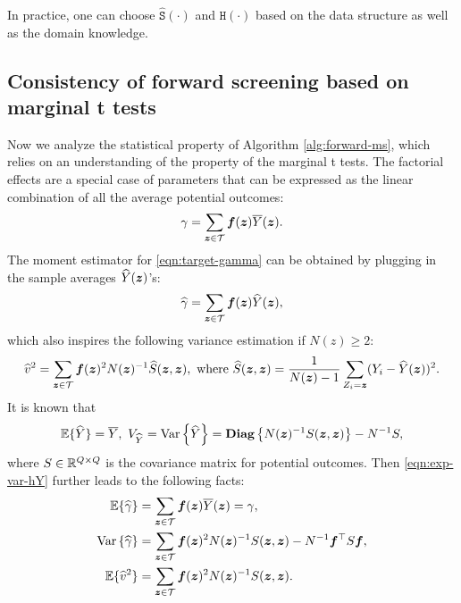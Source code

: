 \documentclass[12pt]{article}
\begin{document}
In practice, one can choose $\hat{\texttt{S}}(\cdot)$ and $\texttt{H}(\cdot)$ based on the data structure as well as the domain knowledge. 

\subsection{Consistency of forward screening based on marginal t tests}

Now we analyze the statistical property of Algorithm \ref{alg:forward-ms}, which relies on an understanding of the property of the marginal t tests. The factorial effects are a special case of parameters that can be expressed as the linear combination of all the average potential outcomes:
\begin{align}
\gamma = \sum_{{\boldsymbol{z}}\in{\mathcal{T}}} {\boldsymbol{f}}({\boldsymbol{z}})\overline{Y}({\boldsymbol{z}}). \label{eqn:target-gamma}
\end{align}
The moment estimator for \eqref{eqn:target-gamma} can be obtained by plugging in the sample averages ${\widehat{Y}}({\boldsymbol{z}})$'s:
\begin{align}\label{eqn:hgamma}
    {\widehat{\gamma}} = \sum_{{\boldsymbol{z}}\in{\mathcal{T}}} {\boldsymbol{f}}({\boldsymbol{z}})\widehat{Y}({\boldsymbol{z}}),
\end{align}
which also inspires the following variance estimation if $N(z) \ge 2$:
\begin{align}\label{eqn:hv2R}
    \widehat{v}^2 = \sum_{{\boldsymbol{z}}\in{\mathcal{T}}} {\boldsymbol{f}}({\boldsymbol{z}})^2 N({\boldsymbol{z}})^{-1} \widehat{S}({\boldsymbol{z}},{\boldsymbol{z}}), \text{ where } \widehat{S}({\boldsymbol{z}},{\boldsymbol{z}}) = \frac{1}{N({\boldsymbol{z}})-1}\sum_{Z_i = {\boldsymbol{z}}} (Y_i - {\widehat{Y}}({\boldsymbol{z}}))^2.
\end{align}
It is known that \citep{li2017general}
\begin{align}\label{eqn:exp-var-hY}
    {\mathbb{E}}\{{\widehat{Y}}\} = \overline{Y},~ V_{\widehat{Y}} = {\operatorname{Var}\left\{{\widehat{Y}}\right\}} = \text{\bfseries Diag}\left\{N({\boldsymbol{z}})^{-1}S({\boldsymbol{z}},{\boldsymbol{z}})\right\} - N^{-1}S,
\end{align}
where $S\in{\mathbb{R}}^{Q\times Q}$ is the covariance matrix for potential outcomes. Then \eqref{eqn:exp-var-hY} further leads to the following facts:
\begin{align}
    {\mathbb{E}}\{{\widehat{\gamma}}\} &= \sum_{{\boldsymbol{z}}\in{\mathcal{T}}} {\boldsymbol{f}}({\boldsymbol{z}})\overline{Y}({\boldsymbol{z}}) = \gamma, \label{eqn:mean-hgamma}\\
    {\operatorname{Var}\left\{{\widehat{\gamma}}\right\}} &= \sum_{{\boldsymbol{z}}\in{\mathcal{T}}}{\boldsymbol{f}}({\boldsymbol{z}})^2N({{\boldsymbol{z}}})^{-1}S({\boldsymbol{z}},{\boldsymbol{z}}) - N^{-1}{\boldsymbol{f}}^\top S {\boldsymbol{f}}, \label{eqn:var-hgamma}\\
    {\mathbb{E}}\{\widehat{v}^2\} & =  \sum_{{\boldsymbol{z}}\in{\mathcal{T}}} {\boldsymbol{f}}({\boldsymbol{z}})^2N({{\boldsymbol{z}}})^{-1}S({\boldsymbol{z}},{\boldsymbol{z}}). \label{eqn:mean-varR}
\end{align}
\end{document}
